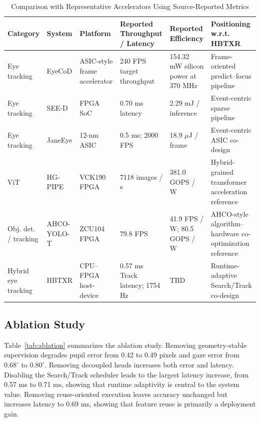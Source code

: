 \documentclass[journal]{IEEEtran}
\begin{document}
\begin{table}[t]
\caption{Comparison with Representative Accelerators Using Source-Reported Metrics}
\label{tab:accel}
\centering
\footnotesize
\begin{tabular}{p{}p{}p{}p{}p{}p{}}
\toprule
Category & System & Platform & Reported Throughput / Latency & Reported Efficiency & Positioning w.r.t. HBTXR \\
\midrule
Eye tracking & EyeCoD & ASIC-style frame accelerator & 240 FPS target throughput & 154.32 mW silicon power at 370 MHz & Frame-oriented predict--focus pipeline \\
Eye tracking & SEE-D & FPGA SoC & 0.70 ms latency & 2.29 mJ / inference & Event-centric sparse pipeline \\
Eye tracking & JaneEye & 12-nm ASIC & 0.5 ms; 2000 FPS & 18.9 $\mu$J / frame & Event-centric ASIC co-design \\
ViT & HG-PIPE & VCK190 FPGA & 7118 images / s & 381.0 GOPS / W & Hybrid-grained transformer acceleration reference \\
Obj. det. / tracking & AHCO-YOLO-T & ZCU104 FPGA & 79.8 FPS & 41.9 FPS / W; 80.5 GOPS / W & AHCO-style algorithm--hardware co-optimization reference \\
Hybrid eye tracking & HBTXR & CPU--FPGA host-device & 0.57 ms Track latency; 1754 Hz & TBD & Runtime-adaptive Search/Track co-design \\
\bottomrule
\end{tabular}
\end{table}

\subsection{Ablation Study}
Table~\ref{tab:ablation} summarizes the ablation study. Removing geometry-stable supervision degrades pupil error from 0.42 to 0.49 pixels and gaze error from $0.68^{\circ}$ to $0.80^{\circ}$. Removing decoupled heads increases both error and latency. Disabling the Search/Track scheduler leads to the largest latency increase, from 0.57 ms to 0.71 ms, showing that runtime adaptivity is central to the system value. Removing reuse-oriented execution leaves accuracy unchanged but increases latency to 0.69 ms, showing that feature reuse is primarily a deployment gain.
\end{document}
